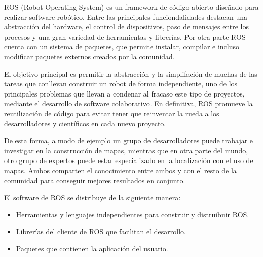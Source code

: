 


ROS (Robot Operating System) es un framework de código abierto diseñado para
realizar software robótico. Entre las principales funciondalidades destacan una
abstracción del hardware, el control de dispositivos, paso de mensajes entre los
procesos y una gran variedad de herramientas y librerías. Por otra parte ROS
cuenta con un sistema de paquetes, que permite instalar, compilar e incluso
modificar paquetes externos creados por la comunidad.

El objetivo principal es permitir la abstracción y la simplifación de  muchas de
las tareas que conllevan construir un robot de forma independiente, uno de los
principales problemas que llevan a condenar al fracaso este tipo de proyectos,
mediante el desarrollo de software colaborativo. En definitiva, ROS promueve la
reutilización de código para evitar tener que reinventar la rueda a los
desarrolladores y científicos en cada nuevo proyecto.

De esta forma, a modo de ejemplo un grupo de desarrolladores puede trabajar e
investigar en la construcción de mapas, mientras que en otra parte del mundo,
otro grupo de expertos puede estar especializado en la localización con el uso
de mapas. Ambos comparten el conocimiento entre ambos y con el resto de la
comunidad para conseguir mejores resultados en conjunto.

El software de ROS se distribuye de la siguiente manera:

\begin{itemize}
  \item Herramientas y lenguajes independientes para construir y distruibuir
  ROS.
  \item Librerías del cliente de ROS que facilitan el desarrollo.
  \item Paquetes que contienen la aplicación del usuario.
\end{itemize}

